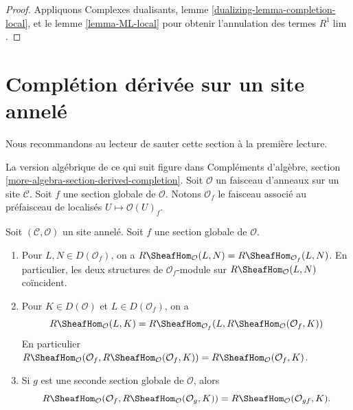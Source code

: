 \begin{proof}
Appliquons Complexes dualisants, lemme \ref{dualizing-lemma-completion-local},
et le lemme \ref{lemma-ML-local} pour obtenir l'annulation des termes $R^1\lim$.
\end{proof}








\section{Complétion dérivée sur un site annelé}
\label{section-derived-completion}

\noindent
Nous recommandons au lecteur de sauter cette section à la première lecture.

\medskip\noindent
La version algébrique de ce qui suit figure dans
Compléments d'algèbre, section \ref{more-algebra-section-derived-completion}.
Soit $\mathcal{O}$ un faisceau d'anneaux sur un site $\mathcal{C}$.
Soit $f$ une section globale de $\mathcal{O}$. Notons
$\mathcal{O}_f$ le faisceau associé au préfaisceau de localisés
$U \mapsto \mathcal{O}(U)_f$.

\begin{lemma}
\label{lemma-map-twice-localize}
Soit $(\mathcal{C}, \mathcal{O})$ un site annelé. Soit $f$ une section
globale de $\mathcal{O}$.
\begin{enumerate}
\item Pour $L, N \in D(\mathcal{O}_f)$, on a
$R\SheafHom_\mathcal{O}(L, N) = R\SheafHom_{\mathcal{O}_f}(L, N)$.
En particulier, les deux structures de $\mathcal{O}_f$-module sur
$R\SheafHom_\mathcal{O}(L, N)$ coïncident.
\item Pour $K \in D(\mathcal{O})$ et
$L \in D(\mathcal{O}_f)$, on a
$$
R\SheafHom_\mathcal{O}(L, K) =
R\SheafHom_{\mathcal{O}_f}(L, R\SheafHom_\mathcal{O}(\mathcal{O}_f, K))
$$
En particulier
$R\SheafHom_\mathcal{O}(\mathcal{O}_f,
R\SheafHom_\mathcal{O}(\mathcal{O}_f, K)) =
R\SheafHom_\mathcal{O}(\mathcal{O}_f, K)$.
\item Si $g$ est une seconde section
globale de $\mathcal{O}$, alors
$$
R\SheafHom_\mathcal{O}(\mathcal{O}_f, R\SheafHom_\mathcal{O}(\mathcal{O}_g, K))
= R\SheafHom_\mathcal{O}(\mathcal{O}_{gf}, K).
$$
\end{enumerate}
\end{lemma}

